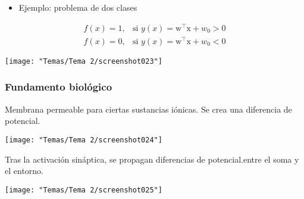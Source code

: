 \begin{minipage}{0.5\textwidth}
	\begin{itemize}[label=\color{red}\textbullet, leftmargin=*]
		\item \color{lightblue}Ejemplo: problema de dos clases
	\end{itemize}
	\[ \begin{array}{ll}
		f(x)=1, & \text{si }y(x)=\mathrm{w}^\intercal\mathrm{x}+w_0>0\\
		f(x)=0, & \text{si }y(x)=\mathrm{w}^\intercal\mathrm{x}+w_0<0
	\end{array} \]
\end{minipage}\qquad\begin{minipage}{0.5\textwidth}
\begin{center}
	\texttt{[image: "Temas/Tema 2/screenshot023"]}
\end{center}

\end{minipage}
\subsubsection{Fundamento biológico}
Membrana permeable para ciertas sustancias iónicas. Se crea una diferencia de potencial.

\begin{center}
	\texttt{[image: "Temas/Tema 2/screenshot024"]}
\end{center}
Tras la activación sináptica, se propagan diferencias de potencial.entre el soma y el entorno.
\begin{center}
	\texttt{[image: "Temas/Tema 2/screenshot025"]}
\end{center}

